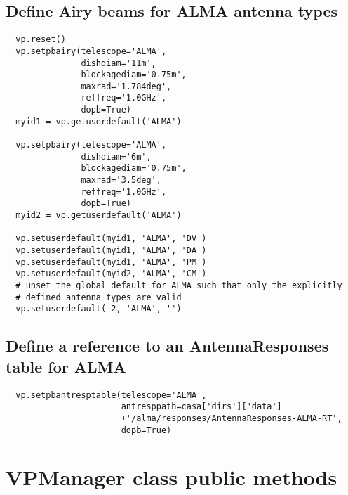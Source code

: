 \documentclass[12pt]{article}
\begin{document}
\subsection{Define Airy beams for ALMA antenna types}
\begin{verbatim}
  vp.reset()
  vp.setpbairy(telescope='ALMA',
               dishdiam='11m',
               blockagediam='0.75m',
               maxrad='1.784deg',
               reffreq='1.0GHz',
               dopb=True)
  myid1 = vp.getuserdefault('ALMA')
  
  vp.setpbairy(telescope='ALMA',
               dishdiam='6m',
               blockagediam='0.75m',
               maxrad='3.5deg',
               reffreq='1.0GHz',
               dopb=True)
  myid2 = vp.getuserdefault('ALMA')

  vp.setuserdefault(myid1, 'ALMA', 'DV')
  vp.setuserdefault(myid1, 'ALMA', 'DA')
  vp.setuserdefault(myid1, 'ALMA', 'PM')
  vp.setuserdefault(myid2, 'ALMA', 'CM')
  # unset the global default for ALMA such that only the explicitly
  # defined antenna types are valid
  vp.setuserdefault(-2, 'ALMA', '')
 \end{verbatim}

\subsection{Define a reference to an AntennaResponses table for ALMA}
\begin{verbatim}
  vp.setpbantresptable(telescope='ALMA',
                       antresppath=casa['dirs']['data']
                       +'/alma/responses/AntennaResponses-ALMA-RT',
                       dopb=True)
\end{verbatim}

\newpage

\section{VPManager class public methods}
\label{appVPMan}
\end{document}
